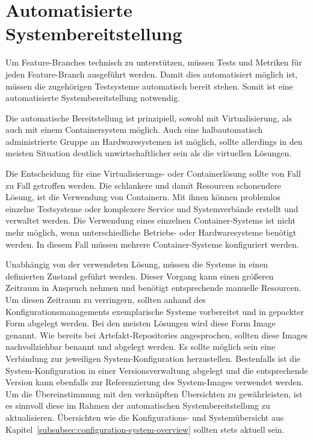 \section{Automatisierte Systembereitstellung}

Um Feature-Branches technisch zu unterstützen, müssen Tests und Metriken für jeden Feature-Branch ausgeführt werden. Damit dies automatisiert möglich ist, müssen die zugehörigen Testsysteme automatisch bereit stehen. Somit ist eine automatisierte Systembereitstellung notwendig.

Die automatische Bereitstellung ist prinzipiell, sowohl mit Virtualisierung, als auch mit einem Containersystem möglich. Auch eine halbautomatisch administrierte Gruppe an Hardwaresystemen ist möglich, sollte allerdings in den meisten Situation deutlich unwirtschaftlicher sein als die virtuellen Lösungen.

Die Entscheidung für eine Virtualisierungs- oder Containerlösung sollte von Fall zu Fall getroffen werden. Die schlankere und damit Resourcen schonendere Lösung, ist die Verwendung von Containern. Mit ihnen können problemlos einzelne Testsysteme oder komplexere Service und Systemverbände erstellt und verwaltet werden. Die Verwendung eines einzelnen Container-Systems ist nicht mehr möglich, wenn unterschiedliche Betriebs- oder Hardwaresysteme benötigt werden. In diesem Fall müssen mehrere Container-Systeme konfiguriert werden.

Unabhängig von der verwendeten Lösung, müssen die Systeme in einen definierten Zustand geführt werden. Dieser Vorgang kann einen größeren Zeitraum in Anspruch nehmen und benötigt entsprechende manuelle Resourcen. Um diesen Zeitraum zu verringern, sollten anhand des Konfigurationsmanagements exemplarische Systeme vorbereitet und in gepackter Form abgelegt werden. Bei den meisten Lösungen wird diese Form \glqq Image\grqq{} genannt. Wie bereits bei \glqq Artefakt-Repositories\grqq{} angesprochen, sollten diese Images nachvollziehbar benannt und abgelegt werden. Es sollte möglich sein eine Verbindung zur jeweiligen System-Konfiguration herzustellen. Bestenfalls ist die System-Konfiguration in einer Versionsverwaltung abgelegt und die entsprechende Version kann ebenfalls zur Referenzierung des System-Images verwendet werden. Um die Übereinstimmung mit den verknüpften Übersichten zu gewährleisten, ist es sinnvoll diese im Rahmen der automatischen Systembereitstellung zu aktualisieren. Übersichten wie die Konfigurations\hyp{} und Systemübersicht aus Kapitel~\ref{subsubsec:configuration-system-overview} sollten stets aktuell sein.

